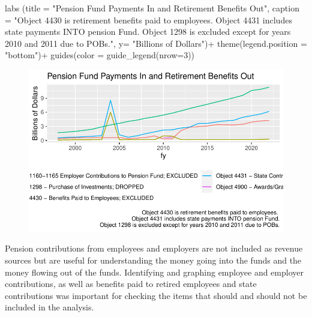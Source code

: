 \documentclass[
  letterpaper,
  DIV=11,
  numbers=noendperiod]{scrreport}
\newenvironment{Shaded}{\begin{snugshade}}{\end{snugshade}}
\newcommand{\AttributeTok}[1]{\textcolor[rgb]{0.40,0.45,0.13}{#1}}
\newcommand{\DecValTok}[1]{\textcolor[rgb]{0.68,0.00,0.00}{#1}}
\newcommand{\FunctionTok}[1]{\textcolor[rgb]{0.28,0.35,0.67}{#1}}
\newcommand{\NormalTok}[1]{\textcolor[rgb]{0.00,0.23,0.31}{#1}}
\newcommand{\SpecialCharTok}[1]{\textcolor[rgb]{0.37,0.37,0.37}{#1}}
\newcommand{\StringTok}[1]{\textcolor[rgb]{0.13,0.47,0.30}{#1}}
\begin{document}
\begin{Shaded}
\begin{Highlighting}[]
  \FunctionTok{labs}\NormalTok{ (}\AttributeTok{title =} \StringTok{"Pension Fund Payments In and Retirement Benefits Out"}\NormalTok{, }
  \AttributeTok{caption =} \StringTok{"Object 4430 is retirement benefits paid to employees. }
\StringTok{  Object 4431 includes state payments INTO pension Fund.}
\StringTok{  Object 1298 is excluded except for years 2010 and 2011 due to POBs."}\NormalTok{,}
  \AttributeTok{y=} \StringTok{"Billions of Dollars"}\NormalTok{)}\SpecialCharTok{+}
    \FunctionTok{theme}\NormalTok{(}\AttributeTok{legend.position =} \StringTok{"bottom"}\NormalTok{)}\SpecialCharTok{+}
  \FunctionTok{guides}\NormalTok{(}\AttributeTok{color =} \FunctionTok{guide\_legend}\NormalTok{(}\AttributeTok{nrow=}\DecValTok{3}\NormalTok{))}
\end{Highlighting}
\end{Shaded}

\begin{figure}[H]

{\centering \includegraphics{./Pensions_files/figure-pdf/unnamed-chunk-2-1.pdf}

}

\end{figure}

Pension contributions from employees and employers are not included as
revenue sources but are useful for understanding the money going into
the funds and the money flowing out of the funds. Identifying and
graphing employee and employer contributions, as well as benefits paid
to retired employees and state contributions was important for checking
the items that should and should not be included in the analysis.

\hfill\break
\end{document}
